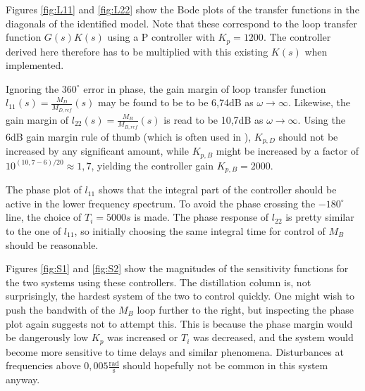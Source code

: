 \documentclass[12pt]{article}
\begin{document}
Figures \ref{fig:L11} and \ref{fig:L22} show the Bode plots of the transfer functions in the diagonals of the identified model. Note that these correspond to the loop transfer function $G(s) K(s)$ using a P controller with $K_p = 1200$. The controller derived here therefore has to be multiplied with this existing $K(s)$ when implemented.

Ignoring the $360^\circ$ error in phase, the gain margin of loop transfer function $l_{11}(s) = \frac{M_D}{M_{D, ref}}(s)$ may be found to be to be 6,74dB as $\omega \rightarrow \infty$. Likewise, the gain margin of $l_{22}(s) = \frac{M_B}{M_{B, ref}}(s)$ is read to be 10,7dB as $\omega \rightarrow \infty$. Using the 6dB gain margin rule of thumb (which is often used in \cite{regtek}), $K_{p, D}$ should not be increased by any significant amount, while $K_{p, B}$ might be increased by a factor of $10^{(10,7-6)/20} \approx 1,7$, yielding the controller gain $K_{p, B} = 2000$.

The phase plot of $l_{11}$ shows that the integral part of the controller should be active in the lower frequency spectrum. To avoid the phase crossing the $-180^\circ$ line, the choice of $T_i = 5000s$ is made. The phase response of $l_{22}$ is pretty similar to the one of $l_{11}$, so initially choosing the same integral time for control of $M_B$ should be reasonable.

Figures \ref{fig:S1} and \ref{fig:S2} show the magnitudes of the sensitivity functions for the two systems using these controllers. The distillation column is, not surprisingly, the hardest system of the two to control quickly. One might wish to push the bandwith of the $M_B$ loop further to the right, but inspecting the phase plot again suggests not to attempt this. This is because the phase margin would be dangerously low $K_p$ was increased or $T_i$ was decreased, and the system would become more sensitive to time delays and similar phenomena. Disturbances at frequencies above $0,005 \frac{\textrm{rad}}{\textrm{s}}$ should hopefully not be common in this system anyway.
\end{document}

